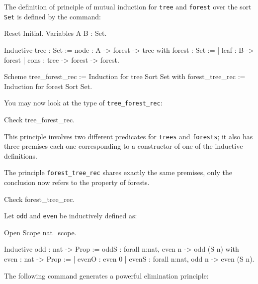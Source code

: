 \firstexample
{}

The definition of principle of mutual induction for {\tt tree} and
{\tt forest} over the sort {\tt Set} is defined by the command:

\begin{coq_eval}
Reset Initial.
Variables A B : Set.
\end{coq_eval}

\begin{coq_example*}
Inductive tree : Set :=
    node : A -> forest -> tree
with forest : Set :=
  | leaf : B -> forest
  | cons : tree -> forest -> forest.

Scheme tree_forest_rec := Induction for tree Sort Set
  with forest_tree_rec := Induction for forest Sort Set.
\end{coq_example*}

You may now look at the type of {\tt tree\_forest\_rec}:

\begin{coq_example}
Check tree_forest_rec.
\end{coq_example}

This principle involves two different predicates for {\tt trees} and
{\tt forests}; it also has three premises each one corresponding to a
constructor of one of the inductive definitions.

The principle {\tt forest\_tree\_rec} shares exactly the same
premises, only the conclusion now refers to the property of forests.

\begin{coq_example}
Check forest_tree_rec.
\end{coq_example}


Let {\tt odd} and {\tt even} be inductively defined as:

\begin{coq_eval}
Open Scope nat_scope.
\end{coq_eval}

\begin{coq_example*}
Inductive odd : nat -> Prop :=
    oddS : forall n:nat, even n -> odd (S n)
with even : nat -> Prop :=
  | evenO : even 0
  | evenS : forall n:nat, odd n -> even (S n).
\end{coq_example*}

The following command generates a powerful elimination
principle:

